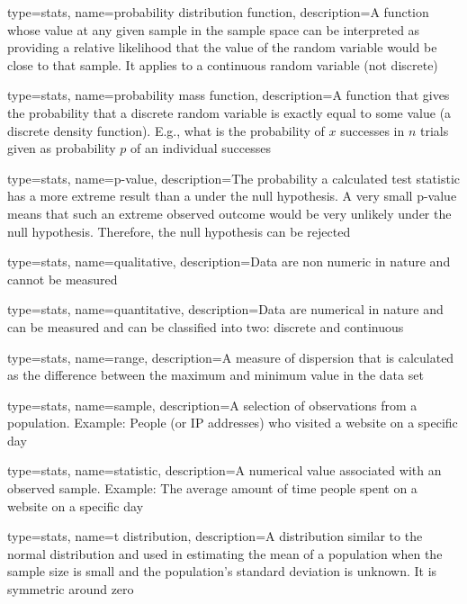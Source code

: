 {
	type=stats,
	name=probability distribution function,
	description={A function whose value at any given sample in the sample space can be interpreted as providing a relative likelihood that the value of the random variable would be close to that sample.  It applies to a continuous random variable (not discrete)}
}

{
	type=stats,
	name=probability mass function,
	description={A function that gives the probability that a discrete random variable is exactly equal to some value (a discrete density function).  E.g., what is the probability of $x$ successes in $n$ trials given as probability $p$ of an individual successes}
}

{
	type=stats,
	name=p-value,
	description={The probability a calculated test statistic has a more extreme result than a under the null hypothesis.   A very small p-value means that such an extreme observed outcome would be very unlikely under the null hypothesis.  Therefore, the null hypothesis can be rejected}
}

{
	type=stats,
	name=qualitative,
	description={Data are non numeric in nature and cannot be measured}
}

{
	type=stats,
	name=quantitative,
	description={Data are numerical in nature and can be measured and can be classified into two: discrete and continuous}
}

{
	type=stats,
	name=range,
	description={A measure of dispersion that is calculated as the difference between the maximum and minimum value in the data set}
}

{
	type=stats,
	name=sample,
	description={A selection of observations from a population. Example: People (or IP addresses) who visited a website on a specific day}
}

{
	type=stats,
	name=statistic,
	description={A numerical value associated with an observed sample. Example: The average amount of time people spent on a website on a specific day}
}

{
	type=stats,
	name=t distribution,
	description={A distribution similar to the normal distribution and used in estimating the mean of a population when the sample size is small and the population's standard deviation is unknown.  It is symmetric around zero}
}

